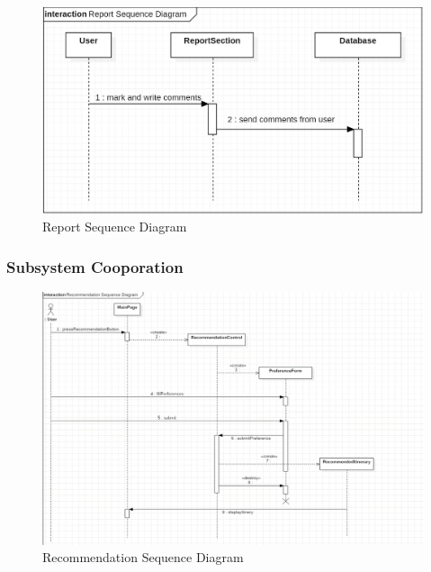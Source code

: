 \documentclass[10pt]{article}
\begin{document}
\begin{figure}[H]
    \centering
    
    \includegraphics[width=14cm]{report.jpg}
    \caption{Report Sequence Diagram}
    \label{Report Sequence Diagram}
\end{figure}

\subsubsection{Subsystem Cooporation}

\begin{figure}[H]
    \centering
    
    \includegraphics[width=14cm]{recommendation.png}
    \caption{Recommendation Sequence Diagram}
    \label{Recommendation Sequence Diagram}
\end{figure}
\end{document}
